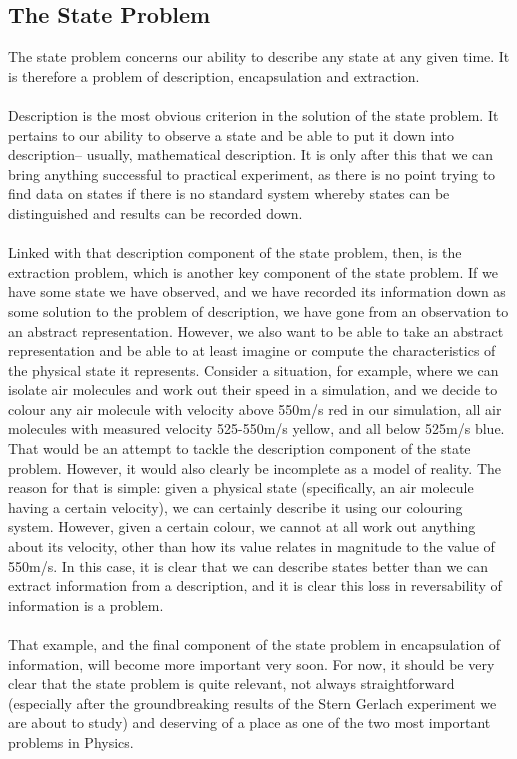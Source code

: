 \subsection*{The State Problem}
The state problem concerns our ability to describe any state at any given time. It is therefore a problem of description, encapsulation and extraction. 
\\\\
Description is the most obvious criterion in the solution of the state problem. It pertains to our ability to observe a state and be able to put it down into description-- usually, mathematical description. It is only after this that we can bring anything successful to practical experiment, as there is no point trying to find data on states if there is no standard system whereby states can be distinguished and results can be recorded down.
\\\\
Linked with that description component of the state problem, then, is the extraction problem, which is another key component of the state problem. If we have some state we have observed, and we have recorded its information down as some solution to the problem of description, we have gone from an observation to an abstract representation. However, we also want to be able to take an abstract representation and be able to at least imagine or compute the characteristics of the physical state it represents. Consider a situation, for example, where we can isolate air molecules and work out their speed in a simulation, and we decide to colour any air molecule with velocity above 550m/s red in our simulation, all air molecules with measured velocity 525-550m/s yellow, and all below 525m/s blue. That would be an attempt to tackle the description component of the state problem. However, it would also clearly be incomplete as a model of reality. The reason for that is simple: given a physical state (specifically, an air molecule having a certain velocity), we can certainly describe it using our colouring system. However, given a certain colour, we cannot at all work out anything about its velocity, other than how its value relates in magnitude to the value of 550m/s. In this case, it is clear that we can describe states better than we can extract information from a description, and it is clear this loss in reversability of information is a problem. 
\\\\
That example, and the final component of the state problem in encapsulation of information, will become more important very soon. For now, it should be very clear that the state problem is quite relevant, not always straightforward (especially after the groundbreaking results of the Stern Gerlach experiment we are about to study) and deserving of a place as one of the two most important problems in Physics.
